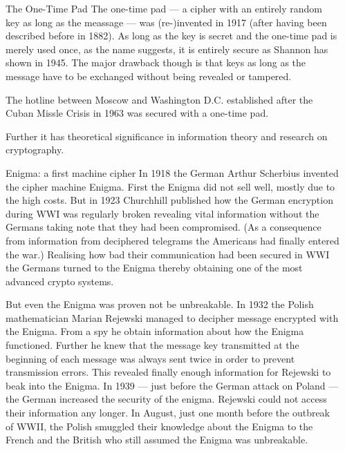 \documentclass[final,hyperref={pdfpagelabels=false}]{beamer}
\begin{document}
\begin{frame}{}
\begin{columns}[t]
\begin{column}{.3\linewidth}
    \end{column}
    \begin{column}{.3\linewidth}
        \begin{block}{The One-Time Pad}
          The one-time pad --- a cipher with an entirely random key as long as the meassage --- was (re-)invented in 1917 (after having been described before in 1882). As long as the key is secret and the one-time pad is merely used once, as the name suggests, it is entirely secure as Shannon has shown in 1945. The major drawback though is that keys as long as the message have to be exchanged without being revealed or tampered. \par
          The hotline between Moscow and Washington D.C. established after the Cuban Missle Crisis in 1963 was secured with a one-time pad. \par
          Further it has theoretical significance in information theory and research on cryptography.
        \end{block}
        \begin{block}{Enigma: a first machine cipher}
          In  1918 the German Arthur Scherbius invented the cipher machine Enigma. First the Enigma did not sell well, mostly due to the high costs. But in 1923 Churchhill published how the German encryption during WWI was regularly broken revealing vital information without the Germans taking note that they had been compromised. (As a consequence from information from deciphered telegrams the Americans had finally entered the war.) Realising how bad their communication had been secured in WWI the Germans turned to the Enigma thereby obtaining one of the most advanced crypto systems. \par
          But even the Enigma was proven not be unbreakable. In 1932 the Polish mathematician Marian Rejewski managed to decipher message encrypted with the Enigma. From a spy he obtain information about how the Enigma functioned. Further he knew that the message key transmitted at the beginning of each message was always sent twice in order to prevent transmission errors. This revealed finally enough information for Rejewski to beak into the Enigma. In 1939 --- just before the German attack on Poland --- the German  increased the security of the enigma. Rejewski could not access their information any longer. In August, just one month before the outbreak of WWII, the Polish smuggled their knowledge about the Enigma to the French and the British who still assumed the Enigma was unbreakable. \par

\end{block}
\end{column}
\end{columns}
\end{frame}
\end{document}
